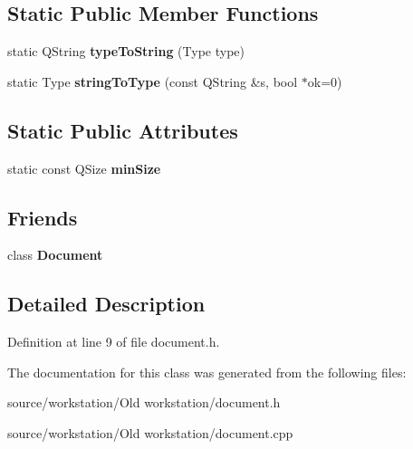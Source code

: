 \subsection*{Static Public Member Functions}
\begin{DoxyCompactItemize}
\item 
\hypertarget{class_shape_ad934b1b94c69b40bacf32cff3ab46748}{static Q\-String {\bfseries type\-To\-String} (Type type)}\label{class_shape_ad934b1b94c69b40bacf32cff3ab46748}

\item 
\hypertarget{class_shape_a77969101a91ae52c2b99daeba1b90c7c}{static Type {\bfseries string\-To\-Type} (const Q\-String \&s, bool $\ast$ok=0)}\label{class_shape_a77969101a91ae52c2b99daeba1b90c7c}

\end{DoxyCompactItemize}
\subsection*{Static Public Attributes}
\begin{DoxyCompactItemize}
\item 
\hypertarget{class_shape_aa941e9c2af8db61f03b5fd214ad31aea}{static const Q\-Size {\bfseries min\-Size}}\label{class_shape_aa941e9c2af8db61f03b5fd214ad31aea}

\end{DoxyCompactItemize}
\subsection*{Friends}
\begin{DoxyCompactItemize}
\item 
\hypertarget{class_shape_a883538034e58fc5c0de7d4e4cab3cef7}{class {\bfseries Document}}\label{class_shape_a883538034e58fc5c0de7d4e4cab3cef7}

\end{DoxyCompactItemize}


\subsection{Detailed Description}


Definition at line 9 of file document.\-h.



The documentation for this class was generated from the following files\-:\begin{DoxyCompactItemize}
\item 
source/workstation/\-Old workstation/document.\-h\item 
source/workstation/\-Old workstation/document.\-cpp\end{DoxyCompactItemize}
